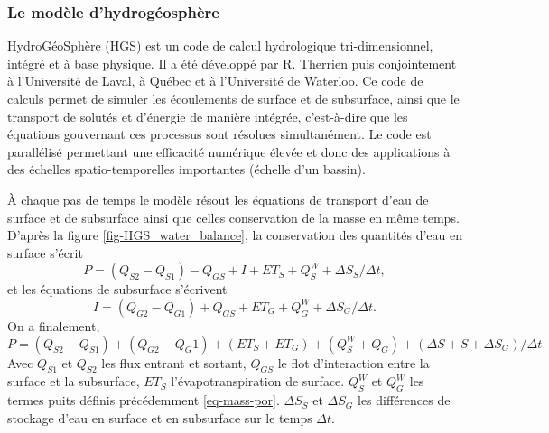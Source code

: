 \documentclass[a4paper,11pt]{article}
\numberwithin{equation}{section}
\begin{document}
\subsubsection{Le modèle d'hydrogéosphère}

HydroGéoSphère (HGS) est un code de calcul hydrologique tri-dimensionnel, intégré et à base physique. Il a été développé par R. Therrien puis conjointement à l’Université de Laval, à Québec et à l’Université de Waterloo. Ce code de calculs permet de simuler les écoulements de surface et de subsurface, ainsi que le transport de solutés et d’énergie de manière intégrée, c’est-à-dire que les équations gouvernant ces processus sont résolues simultanément. Le code est parallélisé permettant une efficacité numérique élevée et donc des applications à des échelles spatio-temporelles importantes (échelle d'un bassin).

À chaque pas de temps le modèle résout les équations de transport d'eau de surface et de subsurface ainsi que celles conservation de la masse en même temps. D'après la figure \ref{fig-HGS_water_balance}, la conservation des quantités d'eau en surface s'écrit
\begin{equation}
	\label{eq-HGS-surface}
	P = (Q_{S2}-Q_{S1})-Q_{GS}+I+ET_S+Q^W_S+\Delta S_S /\Delta t,
\end{equation}
et les équations de subsurface s'écrivent
\begin{equation}
	\label{eq-HGS-subsurface}
	I = (Q_{G2}-Q_{G1})+Q_{GS}+ET_G + Q^W_G+\Delta S_G/\Delta t.
\end{equation}
On a finalement,
\begin{equation}
	\label{eq-HGS-bilan-tot}
	P=(Q_{S2}-Q_{S1})+(Q_{G2}-Q_G1)+(ET_S+ET_G)+(Q^W_S+Q_G)+(\Delta S+S+\Delta S_G)/\Delta t
\end{equation}
Avec $Q_{S1}$ et $Q_{S2}$ les flux entrant et sortant, $Q_{GS}$ le flot d'interaction entre la surface et la subsurface, $ET_S$ l'évapotranspiration de surface. $Q^W_S$ et $Q^W_G$ les termes puits définis précédemment \eqref{eq-mass-por}. $\Delta S_S$ et $\Delta S_G$ les différences de stockage d'eau en surface et en subsurface sur le temps $\Delta t$.
\end{document}
